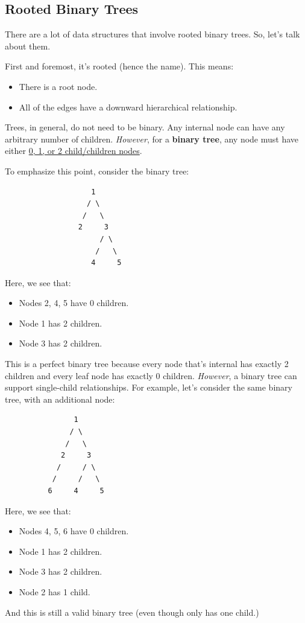 \documentclass[letterpaper]{article}
\begin{document}
\subsection{Rooted Binary Trees}
There are a lot of data structures that involve rooted binary trees. So, let's talk about them. 

\bigskip 

First and foremost, it's rooted (hence the name). This means: 
\begin{itemize}
    \item There is a root node. 
    \item All of the edges have a downward hierarchical relationship. 
\end{itemize}
Trees, in general, do not need to be binary. Any internal node can have any arbitrary number of children. \emph{However}, for a \textbf{binary tree}, any node must have either \underline{0, 1, or 2 child/children nodes}. 

\bigskip 

To emphasize this point, consider the binary tree: 
\begin{verbatim}
                    1
                   / \  
                  /   \
                 2     3 
                      / \
                     /   \ 
                    4     5
\end{verbatim}
Here, we see that: 
\begin{itemize}
    \item Nodes 2, 4, 5 have 0 children. 
    \item Node 1 has 2 children. 
    \item Node 3 has 2 children. 
\end{itemize}
This is a perfect binary tree because every node that's internal has exactly 2 children and every leaf node has exactly 0 children. \emph{However}, a binary tree can support single-child relationships. For example, let's consider the same binary tree, with an additional node: 
\begin{verbatim}
                1
               / \  
              /   \
             2     3 
            /     / \
           /     /   \ 
          6     4     5
\end{verbatim}
Here, we see that: 
\begin{itemize}
    \item Nodes 4, 5, 6 have 0 children. 
    \item Node 1 has 2 children. 
    \item Node 3 has 2 children. 
    \item Node 2 has 1 child. 
\end{itemize}
And this is still a valid binary tree (even though  only has one child.)
\end{document}
